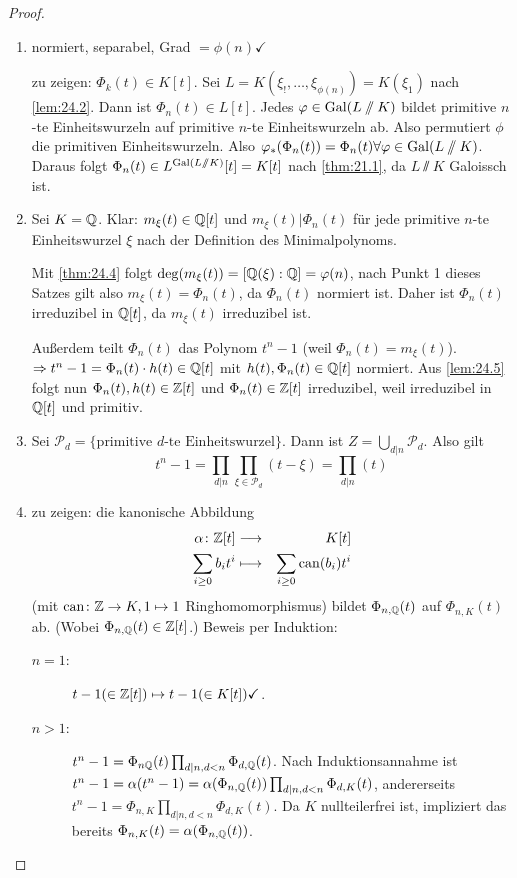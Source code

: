 \documentclass[12pt,a4paper]{scrartcl}
\begin{document}
\begin{proof}
	\leavevmode
	\begin{enumerate}
		\item normiert, separabel, Grad $= \phi(n)\checkmark$
		
		zu zeigen: $\Phi_k(t)\in K[t]$. Sei $L = K(\xi_!,\dots, \xi_{\phi(n)}) = K(\xi_1)$ nach \ref{lem:24.2}. Dann ist $\Phi_n(t)\in L[t]$. Jedes $\varphi\in \operatorname{Gal}(L\sslash K)$ bildet primitive $n$-te Einheitswurzeln auf primitive $n$-te Einheitswurzeln ab. Also permutiert $\phi$ die primitiven Einheitswurzeln. Also $\varphi_*(\Phi_n(t)) = \Phi_n(t)\forall \varphi\in \operatorname{Gal}(L\sslash K)$. Daraus folgt $\Phi_n(t)\in L^{\operatorname{Gal}(L\sslash K)}[t] = K[t]$ nach \ref{thm:21.1}, da $L\sslash K$ Galoissch ist.
		
		\item Sei $K  = \mathbb Q$. Klar: $m_{\xi}(t)\in \mathbb Q[t]$ und $m_{\xi}(t)|\Phi_n(t)$ für jede primitive $n$-te Einheitswurzel $\xi$ nach der Definition des Minimalpolynoms.
		
		Mit \ref{thm:24.4} folgt $\deg(m_\xi(t)) = [\mathbb Q(\xi):\mathbb Q] = \varphi(n)$, nach Punkt 1 dieses Satzes gilt also $m_{\xi}(t) = \Phi_n(t)$, da $\Phi_n(t)$ normiert ist. Daher ist $\Phi_n(t)$ irreduzibel in $\mathbb Q[t]$, da $m_{\xi}(t)$ irreduzibel ist.
		
		Außerdem teilt $\Phi_n(t)$ das Polynom $t^n-1$ (weil $\Phi_n(t) = m_{\xi}(t)$). $\Rightarrow t^n-1 = \Phi_n(t)\cdot h(t)\in \mathbb Q[t]$ mit $h(t), \Phi_n(t)\in\mathbb Q[t]$ normiert. Aus \ref{lem:24.5} folgt nun $\Phi_n(t), h(t)\in\mathbb Z[t]$ und $\Phi_n(t)\in\mathbb Z[t]$ irreduzibel, weil irreduzibel in $\mathbb Q[t]$ und primitiv. 
		\item Sei $\mathcal{P}_d  = \{\text{primitive }d\text{-te Einheitswurzel}\}$. Dann ist $Z = \bigcup\limits_{d|n}\mathcal{P}_d$. Also gilt $$t^n-1 = \prod_{d|n}\prod_{\xi\in\mathcal{P}_d}(t-\xi) = \prod_{d|n}(t)$$
		\item zu zeigen: die kanonische Abbildung
		\begin{eqnarray*}
			\alpha\colon \mathbb Z[t] & \longrightarrow & K[t]\\
			\sum_{i \geq 0}b_it^i & \longmapsto & \sum_{i\geq 0}\operatorname{can}(b_i)t^i
		\end{eqnarray*}
		(mit $\operatorname{can}\colon \mathbb Z\to K, 1\mapsto 1$ Ringhomomorphismus) bildet $\Phi_{n,\mathbb Q}(t)$ auf $\Phi_{n, K}(t)$ ab. (Wobei $\Phi_{n, \mathbb Q}(t)\in\mathbb Z[t]$.) Beweis per Induktion:
		\begin{description}
			\item[$n = 1$:] $t-1 (\in \mathbb Z[t]) \mapsto t-1 (\in K[t]) \checkmark$.
			\item[$n>1$:] $t^n-1 = \Phi_{n\mathbb Q}(t)\prod_{d|n, d<n}\Phi_{d,\mathbb Q}(t)$. Nach Induktionsannahme ist $t^n-1  =\alpha(t^n-1) = \alpha(\Phi_{n,\mathbb Q}(t))\prod_{d|n, d<n}\Phi_{d, K}(t)$, andererseits $t^n-1 = \Phi_{n,K}\prod_{d|n, d<n}\Phi_{d, K}(t)$.  Da $K$ nullteilerfrei ist, impliziert das bereits $\Phi_{n,K}(t) = \alpha(\Phi_{n,\mathbb Q}(t))$.
		\end{description}
	\end{enumerate}
\end{proof}
\end{document}
